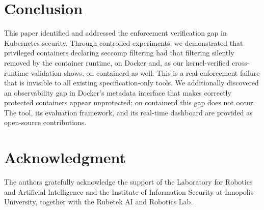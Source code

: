 \documentclass[conference]{IEEEtran}
\begin{document}
\section{Conclusion}

This paper identified and addressed the enforcement verification gap in Kubernetes security. Through controlled experiments, we demonstrated that privileged containers declaring seccomp filtering had that filtering silently removed by the container runtime, on Docker and, as our kernel-verified cross-runtime validation shows, on containerd as well. This is a real enforcement failure that is invisible to all existing specification-only tools. We additionally discovered an observability gap in Docker's metadata interface that makes correctly protected containers appear unprotected; on containerd this gap does not occur. The tool, its evaluation framework, and its real-time dashboard are provided as open-source contributions.

\section*{Acknowledgment}

The authors gratefully acknowledge the support of the Laboratory for Robotics and Artificial Intelligence and the Institute of Information Security at Innopolis University, together with the Rubetek AI and Robotics Lab.

\balance
\end{document}
